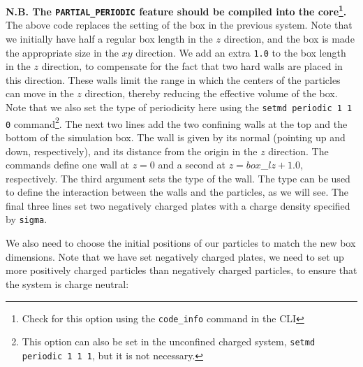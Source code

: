 \documentclass[
a4paper,                        %
11pt,                           %
twoside,                        %
footsepline,                    %
headsepline,                    %
headexclude,                    %
footexclude,                    %
pagesize,                       %
]{scrartcl}
\newtheorem{task}{Task}
\begin{document}
\noindent \textbf{N.B. The \texttt{PARTIAL\_PERIODIC} feature should be compiled into the \es{} core\footnote{Check for this option using the \texttt{code\_info} command in the CLI}.} The above code replaces the setting of the box in the previous system. Note that we initially have half a regular box length in the $z$ direction, and the box is made the appropriate size in the $xy$ direction. We add an extra \texttt{1.0} to the box length in the $z$ direction, to compensate for the fact that two hard walls are placed in this direction. These walls limit the range in which the centers of the particles can move in the $z$ direction, thereby reducing the effective volume of the box. Note that we also set the type of periodicity here using the \verb|setmd periodic 1 1 0| command\footnote{This option can also be set in the unconfined charged system, \texttt{setmd periodic 1 1 1}, but it is not necessary.}. The next two lines add the two confining walls at the top and the bottom of the simulation box. The wall is given by its normal (pointing up and down, respectively), and its distance from the origin in the $z$ direction. The commands define one wall at $z=0$ and a second at $z=box$\_$lz+1.0$, respectively. The third argument sets the type of the wall. The type can be used to define the interaction between the walls and the particles, as we will see. The final three lines set two negatively charged plates with a charge density specified by \verb|sigma|.  

\vspace{1cm}
\vspace{1cm}

We also need to choose the initial positions of our particles to match the new box dimensions. Note that we have set negatively charged plates, we need to set up more positively charged particles than negatively charged particles, to ensure that the system is charge neutral:
\end{document}
